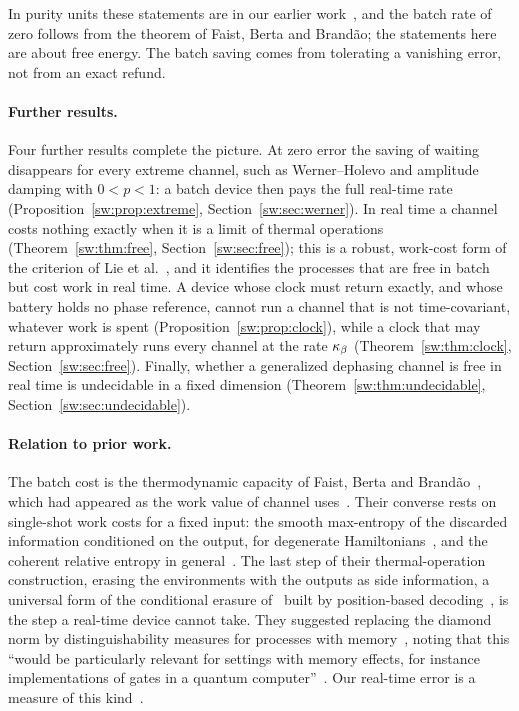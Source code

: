In purity units these statements are in our earlier work~\cite{ImmediateDelivery}, and the batch rate of zero follows from the theorem of Faist, Berta and Brand\~ao; the statements here are about free energy. The batch saving comes from tolerating a vanishing error, not from an exact refund.

\paragraph{Further results.} Four further results complete the picture. At zero error the saving of waiting disappears for every extreme channel, such as Werner--Holevo and amplitude damping with $0<p<1$: a batch device then pays the full real-time rate (Proposition~\ref{sw:prop:extreme}, Section~\ref{sw:sec:werner}). In real time a channel costs nothing exactly when it is a limit of thermal operations (Theorem~\ref{sw:thm:free}, Section~\ref{sw:sec:free}); this is a robust, work-cost form of the criterion of Lie et al.~\cite{LieEtAl26}, and it identifies the processes that are free in batch but cost work in real time. A device whose clock must return exactly, and whose battery holds no phase reference, cannot run a channel that is not time-covariant, whatever work is spent (Proposition~\ref{sw:prop:clock}), while a clock that may return approximately runs every channel at the rate $\kappa_\beta$ (Theorem~\ref{sw:thm:clock}, Section~\ref{sw:sec:free}). Finally, whether a generalized dephasing channel is free in real time is undecidable in a fixed dimension (Theorem~\ref{sw:thm:undecidable}, Section~\ref{sw:sec:undecidable}).

\paragraph{Relation to prior work.} The batch cost is the thermodynamic capacity of Faist, Berta and Brand\~ao~\cite{FBB19,FBB21}, which had appeared as the work value of channel uses~\cite{NGP15}. Their converse rests on single-shot work costs for a fixed input: the smooth max-entropy of the discarded information conditioned on the output, for degenerate Hamiltonians~\cite{FDOR15}, and the coherent relative entropy in general~\cite{FR18}. The last step of their thermal-operation construction, erasing the environments with the outputs as side information, a universal form of the conditional erasure of~\cite{delRio11} built by position-based decoding~\cite[Sec.~7]{FBB21}, is the step a real-time device cannot take. They suggested replacing the diamond norm by distinguishability measures for processes with memory~\cite{Chiribella08}, noting that this ``would be particularly relevant for settings with memory effects, for instance implementations of gates in a quantum computer''~\cite{FBB19}. Our real-time error is a measure of this kind~\cite{Chiribella08,GutoskiWatrous07}.

